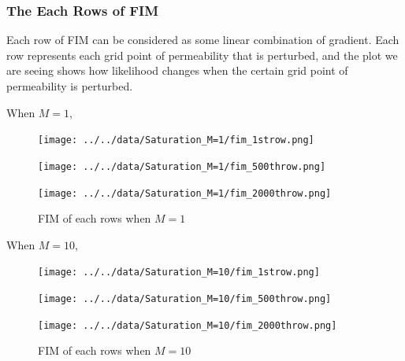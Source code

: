 \documentclass[
]{article}
\begin{document}
\subsubsection{The Each Rows of FIM}\label{the-each-rows-of-fim}

Each row of FIM can be considered as some linear combination of
gradient. Each row represents each grid point of permeability that is
perturbed, and the plot we are seeing shows how likelihood changes when
the certain grid point of permeability is perturbed.

When \(M=1\),

\begin{figure}

\begin{minipage}{0.33\linewidth}

\texttt{[image: ../../data/Saturation\_M=1/fim\_1strow.png]}

\end{minipage}%
%
\begin{minipage}{0.33\linewidth}

\texttt{[image: ../../data/Saturation\_M=1/fim\_500throw.png]}

\end{minipage}%
%
\begin{minipage}{0.33\linewidth}

\texttt{[image: ../../data/Saturation\_M=1/fim\_2000throw.png]}

\end{minipage}%

\caption{\label{fig-eig1000}FIM of each rows when \(M=1\)}

\end{figure}%

When \(M=10\),

\begin{figure}

\begin{minipage}{0.33\linewidth}

\texttt{[image: ../../data/Saturation\_M=10/fim\_1strow.png]}

\end{minipage}%
%
\begin{minipage}{0.33\linewidth}

\texttt{[image: ../../data/Saturation\_M=10/fim\_500throw.png]}

\end{minipage}%
%
\begin{minipage}{0.33\linewidth}

\texttt{[image: ../../data/Saturation\_M=10/fim\_2000throw.png]}

\end{minipage}%

\caption{\label{fig-eig1000}FIM of each rows when \(M=10\)}

\end{figure}%
\end{document}
